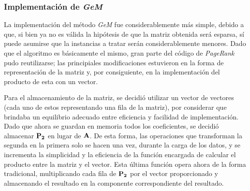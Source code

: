         \subsubsection{Implementación de \emph{GeM}}

        La implementación del método \emph{GeM} fue considerablemente más simple, debido a que, si bien ya no es válida la hipótesis de que la matriz obtenida será esparsa, sí puede asumirse que la instancias a tratar serán considerablemente menores. Dado que el algoritmo es básicamente el mismo, gran parte del código de \emph{PageRank} pudo reutilizarse; las principiales modificaciones estuvieron en la forma de representación de la matriz y, por consiguiente, en la implementación del producto de esta con un vector.

        Para el almacenamiento de la matriz, se decidió utilizar un vector de vectores (cada uno de estos representando una fila de la matriz), por considerar que brindaba un equilibrio adecuado entre eficiencia y facilidad de implementación. Dado que ahora se guardan en memoria todos los coeficientes, se decidió almacenar $\mathbf{P_2}$ en lugar de $\mathbf{A}$. De esta forma, las operaciones que transforman la segunda en la primera solo se hacen una vez, durante la carga de los datos, y se incrementa la simplicidad y la eficiencia de la función encargada de calcular el producto entre la matriz y el vector. Esta última función opera ahora de la forma tradicional, multiplicando cada fila de $\mathbf{P_2}$ por el vector proporcionado y almacenando el resultado en la componente correspondiente del resultado.
